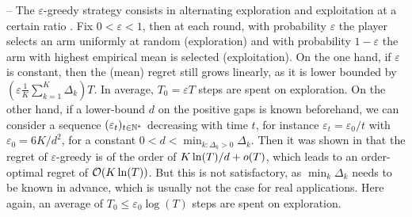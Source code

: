 -- The \textcolor{deeppurple}{$\varepsilon$-greedy strategy} consists in alternating exploration and exploitation at a certain ratio \cite{Auer02}.
Fix $0<\varepsilon<1$, then at each round, with probability $\varepsilon$ the player selects an arm uniformly at random (exploration) and with probability $1-\varepsilon$ the arm with highest empirical mean is selected (exploitation).
On the one hand, if $\varepsilon$ is constant, then the (mean) regret still grows linearly, as it is lower bounded by $(\varepsilon \frac{1}{K} \sum_{k=1}^K \Delta_k) T$.
In average, $T_0 = \varepsilon T$ steps are spent on exploration.
%
On the other hand, if a lower-bound $d$ on the positive gaps is known beforehand,
we can consider a sequence $(\varepsilon_t)_{t\in\mathbb{N}^*}$ decreasing with time $t$, for instance $\varepsilon_t = \varepsilon_0 / t$ with $\varepsilon_0 = 6 K / d^2$, for a constant $0 < d < \min_{k: \Delta_k > 0} \Delta_k$.
Then it was shown in \cite{Auer02} that the regret of $\varepsilon$-greedy is of the order of $K \ln(T) / d + \mathop{}\mathopen{}o\mathopen{}\left(T\right)$, which leads to an order-optimal regret of $\mathop{}\mathopen{}\mathcal{O}\mathopen{}\left(K \ln(T)\right)$.
But this is not satisfactory, as $\min_k \Delta_k$ needs to be known in advance, which is usually not the case for real applications.
Here again, an average of $T_0 \leq \varepsilon_0 \log(T)$ steps are spent on exploration.

